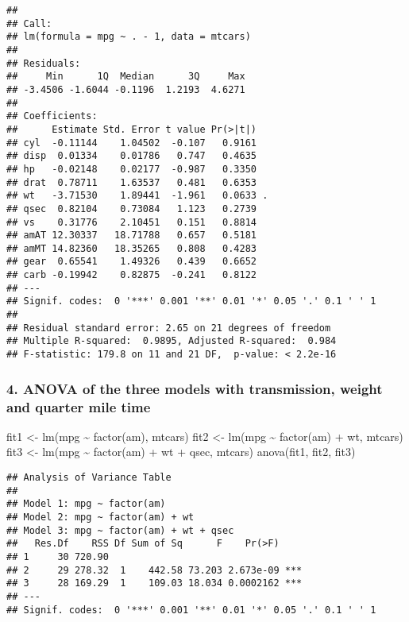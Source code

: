 \documentclass[
]{article}
\newenvironment{Shaded}{\begin{snugshade}}{\end{snugshade}}
\newcommand{\FunctionTok}[1]{\textcolor[rgb]{0.00,0.00,0.00}{#1}}
\newcommand{\NormalTok}[1]{#1}
\newcommand{\OtherTok}[1]{\textcolor[rgb]{0.56,0.35,0.01}{#1}}
\newcommand{\SpecialCharTok}[1]{\textcolor[rgb]{0.00,0.00,0.00}{#1}}
\begin{document}
\begin{verbatim}
## 
## Call:
## lm(formula = mpg ~ . - 1, data = mtcars)
## 
## Residuals:
##     Min      1Q  Median      3Q     Max 
## -3.4506 -1.6044 -0.1196  1.2193  4.6271 
## 
## Coefficients:
##      Estimate Std. Error t value Pr(>|t|)  
## cyl  -0.11144    1.04502  -0.107   0.9161  
## disp  0.01334    0.01786   0.747   0.4635  
## hp   -0.02148    0.02177  -0.987   0.3350  
## drat  0.78711    1.63537   0.481   0.6353  
## wt   -3.71530    1.89441  -1.961   0.0633 .
## qsec  0.82104    0.73084   1.123   0.2739  
## vs    0.31776    2.10451   0.151   0.8814  
## amAT 12.30337   18.71788   0.657   0.5181  
## amMT 14.82360   18.35265   0.808   0.4283  
## gear  0.65541    1.49326   0.439   0.6652  
## carb -0.19942    0.82875  -0.241   0.8122  
## ---
## Signif. codes:  0 '***' 0.001 '**' 0.01 '*' 0.05 '.' 0.1 ' ' 1
## 
## Residual standard error: 2.65 on 21 degrees of freedom
## Multiple R-squared:  0.9895, Adjusted R-squared:  0.984 
## F-statistic: 179.8 on 11 and 21 DF,  p-value: < 2.2e-16
\end{verbatim}

\hypertarget{anova-of-the-three-models-with-transmission-weight-and-quarter-mile-time}{%
\subsubsection{4. ANOVA of the three models with transmission, weight
and quarter mile
time}\label{anova-of-the-three-models-with-transmission-weight-and-quarter-mile-time}}

\begin{Shaded}
\begin{Highlighting}[]
\NormalTok{fit1 }\OtherTok{\textless{}{-}} \FunctionTok{lm}\NormalTok{(mpg }\SpecialCharTok{\textasciitilde{}} \FunctionTok{factor}\NormalTok{(am), mtcars)}
\NormalTok{fit2 }\OtherTok{\textless{}{-}} \FunctionTok{lm}\NormalTok{(mpg }\SpecialCharTok{\textasciitilde{}} \FunctionTok{factor}\NormalTok{(am) }\SpecialCharTok{+}\NormalTok{ wt, mtcars)}
\NormalTok{fit3 }\OtherTok{\textless{}{-}} \FunctionTok{lm}\NormalTok{(mpg }\SpecialCharTok{\textasciitilde{}} \FunctionTok{factor}\NormalTok{(am) }\SpecialCharTok{+}\NormalTok{ wt }\SpecialCharTok{+}\NormalTok{ qsec, mtcars)}
\FunctionTok{anova}\NormalTok{(fit1, fit2, fit3)}
\end{Highlighting}
\end{Shaded}

\begin{verbatim}
## Analysis of Variance Table
## 
## Model 1: mpg ~ factor(am)
## Model 2: mpg ~ factor(am) + wt
## Model 3: mpg ~ factor(am) + wt + qsec
##   Res.Df    RSS Df Sum of Sq      F    Pr(>F)    
## 1     30 720.90                                  
## 2     29 278.32  1    442.58 73.203 2.673e-09 ***
## 3     28 169.29  1    109.03 18.034 0.0002162 ***
## ---
## Signif. codes:  0 '***' 0.001 '**' 0.01 '*' 0.05 '.' 0.1 ' ' 1
\end{verbatim}
\end{document}
